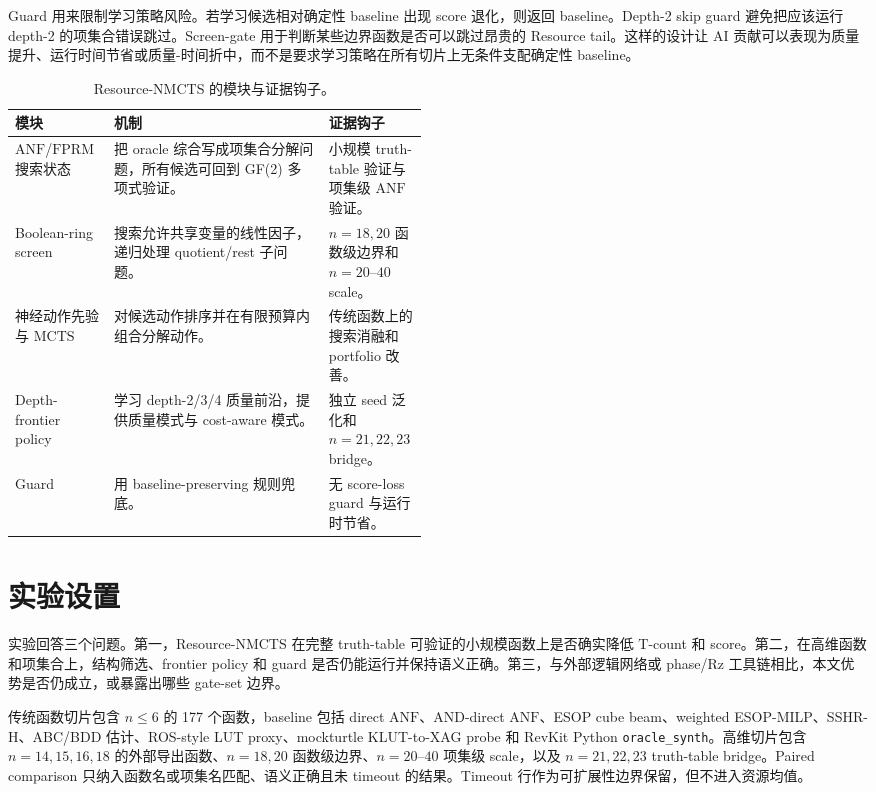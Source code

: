 \documentclass[UTF8,fontset=macnew,11pt]{ctexart}
\newcommand{\method}{Resource-NMCTS}
\newcommand{\anf}{\ensuremath{\mathrm{ANF}}}
\newcommand{\fprm}{\ensuremath{\mathrm{FPRM}}}
\newcommand{\mcts}{\ensuremath{\mathrm{MCTS}}}
\newcommand{\ttable}{truth-table}
\begin{document}
Guard 用来限制学习策略风险。若学习候选相对确定性 baseline 出现 score 退化，则返回 baseline。Depth-2 skip guard 避免把应该运行 depth-2 的项集合错误跳过。Screen-gate 用于判断某些边界函数是否可以跳过昂贵的 Resource tail。这样的设计让 AI 贡献可以表现为质量提升、运行时间节省或质量-时间折中，而不是要求学习策略在所有切片上无条件支配确定性 baseline。

\begin{table}[H]
\centering
\small
\caption{\method{} 的模块与证据钩子。}
\label{tab:modules}
\begin{tabularx}{\linewidth}{>{\raggedright\arraybackslash}p{0.24\linewidth}>{\raggedright\arraybackslash}X>{\raggedright\arraybackslash}p{0.24\linewidth}}
\toprule
模块 & 机制 & 证据钩子 \\
\midrule
\anf{}/\fprm{} 搜索状态 & 把 oracle 综合写成项集合分解问题，所有候选可回到 GF(2) 多项式验证。 & 小规模 \ttable{} 验证与项集级 \anf{} 验证。 \\
Boolean-ring screen & 搜索允许共享变量的线性因子，递归处理 quotient/rest 子问题。 & $n=18,20$ 函数级边界和 $n=20$--$40$ scale。 \\
神经动作先验与 \mcts{} & 对候选动作排序并在有限预算内组合分解动作。 & 传统函数上的搜索消融和 portfolio 改善。 \\
Depth-frontier policy & 学习 depth-2/3/4 质量前沿，提供质量模式与 cost-aware 模式。 & 独立 seed 泛化和 $n=21,22,23$ bridge。 \\
Guard & 用 baseline-preserving 规则兜底。 & 无 score-loss guard 与运行时节省。 \\
\bottomrule
\end{tabularx}
\end{table}

\section{实验设置}

实验回答三个问题。第一，\method{} 在完整 truth-table 可验证的小规模函数上是否确实降低 T-count 和 score。第二，在高维函数和项集合上，结构筛选、frontier policy 和 guard 是否仍能运行并保持语义正确。第三，与外部逻辑网络或 phase/Rz 工具链相比，本文优势是否仍成立，或暴露出哪些 gate-set 边界。

传统函数切片包含 $n\leq6$ 的 177 个函数，baseline 包括 direct \anf{}、AND-direct \anf{}、ESOP cube beam、weighted ESOP-MILP、SSHR-H、ABC/BDD 估计、ROS-style LUT proxy、mockturtle KLUT-to-XAG probe 和 RevKit Python \texttt{oracle\_synth}。高维切片包含 $n=14,15,16,18$ 的外部导出函数、$n=18,20$ 函数级边界、$n=20$--$40$ 项集级 scale，以及 $n=21,22,23$ truth-table bridge。Paired comparison 只纳入函数名或项集名匹配、语义正确且未 timeout 的结果。Timeout 行作为可扩展性边界保留，但不进入资源均值。
\end{document}
